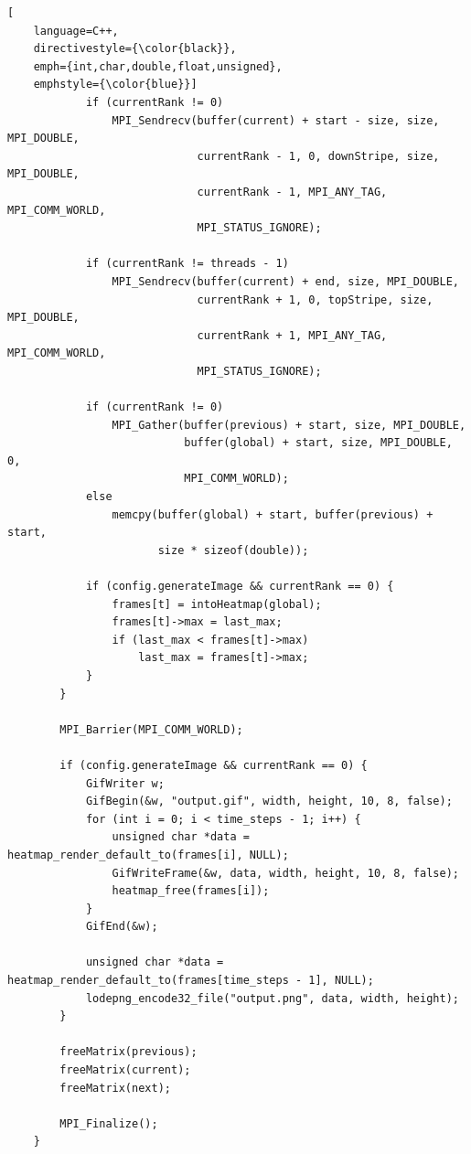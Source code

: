 \begin{lstlisting}[
    language=C++,
    directivestyle={\color{black}}, 
    emph={int,char,double,float,unsigned}, 
    emphstyle={\color{blue}}]
            if (currentRank != 0)
                MPI_Sendrecv(buffer(current) + start - size, size, MPI_DOUBLE,
                             currentRank - 1, 0, downStripe, size, MPI_DOUBLE,
                             currentRank - 1, MPI_ANY_TAG, MPI_COMM_WORLD,
                             MPI_STATUS_IGNORE);
    
            if (currentRank != threads - 1)
                MPI_Sendrecv(buffer(current) + end, size, MPI_DOUBLE,
                             currentRank + 1, 0, topStripe, size, MPI_DOUBLE,
                             currentRank + 1, MPI_ANY_TAG, MPI_COMM_WORLD,
                             MPI_STATUS_IGNORE);
    
            if (currentRank != 0)
                MPI_Gather(buffer(previous) + start, size, MPI_DOUBLE,
                           buffer(global) + start, size, MPI_DOUBLE, 0,
                           MPI_COMM_WORLD);
            else
                memcpy(buffer(global) + start, buffer(previous) + start,
                       size * sizeof(double));
    
            if (config.generateImage && currentRank == 0) {
                frames[t] = intoHeatmap(global);
                frames[t]->max = last_max;
                if (last_max < frames[t]->max)
                    last_max = frames[t]->max;
            }
        }
    
        MPI_Barrier(MPI_COMM_WORLD);
    
        if (config.generateImage && currentRank == 0) {
            GifWriter w;
            GifBegin(&w, "output.gif", width, height, 10, 8, false);
            for (int i = 0; i < time_steps - 1; i++) {
                unsigned char *data = heatmap_render_default_to(frames[i], NULL);
                GifWriteFrame(&w, data, width, height, 10, 8, false);
                heatmap_free(frames[i]);
            }
            GifEnd(&w);
    
            unsigned char *data = heatmap_render_default_to(frames[time_steps - 1], NULL);
            lodepng_encode32_file("output.png", data, width, height);
        }
    
        freeMatrix(previous);
        freeMatrix(current);
        freeMatrix(next);
    
        MPI_Finalize();
    }
    
\end{lstlisting}
